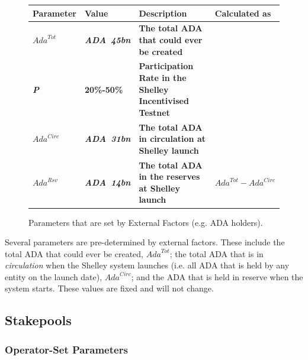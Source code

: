 \documentclass[11pt,a4paper,dvipsnames,twosided,final]{article}
\newcommand{\ada}{ADA{}}
\newcommand{\ADA}[1]{\textbf{\emph{\ada~{#1}}}}
\begin{document}
\begin{figure}[h!]
\begin{center}
\begin{tabular}{||l|l|p{6cm}|l||}
  \hline \hline
\textbf{Parameter} & \textbf{Value} & \textbf{Description} & \textbf{Calculated as} \\\hline
\textbf{\color{blue} $\textit{Ada}^{Tot}$ } & \textbf{\color{blue}  \ADA{45bn} } & \textbf{\color{blue}  The total \ada{} that could ever be created } & \textbf{\color{blue}  } \\\hline
\textbf{\color{blue} \emph{P} } & \textbf{\color{blue}  20\%-50\% } & \textbf{\color{blue}  Participation Rate in the Shelley Incentivised Testnet } & \textbf{\color{blue}  } \\\hline
\textbf{\color{blue} $\textit{Ada}^{\textit{Circ}}$ } & \textbf{\color{blue}  \ADA{31bn} } & \textbf{\color{blue}  The total \ada{} in circulation at Shelley launch } & \textbf{\color{blue}  } \\\hline
\textbf{\color{blue} $\textit{Ada}^{\textit{Rsv}}$ } & \textbf{\color{blue}  \ADA{14bn} } & \textbf{\color{blue}  The total \ada{} in the reserves at Shelley launch } & \textbf{\color{blue}  $\textit{Ada}^{Tot} - \textit{Ada}^{\textit{Circ}}$ } \\\hline
\hline
\end{tabular}
\end{center}
\caption{Parameters that are set by External Factors (e.g. \ada{} holders).}
\end{figure}

\noindent
Several parameters are pre-determined by external factors. These include the
total \ada{} that could ever be created, $\textit{Ada}^{Tot}$;
the total \ada{} that is in \emph{circulation} when the Shelley system launches
(i.e. all \ada{} that is held by any entity on the launch date), $\textit{Ada}^{\textit{Circ}}$;
and the \ada{} that is held in reserve when the system starts.
These values are fixed and will not change.

\subsection{Stakepools}

\subsubsection*{Operator-Set Parameters}
\end{document}
